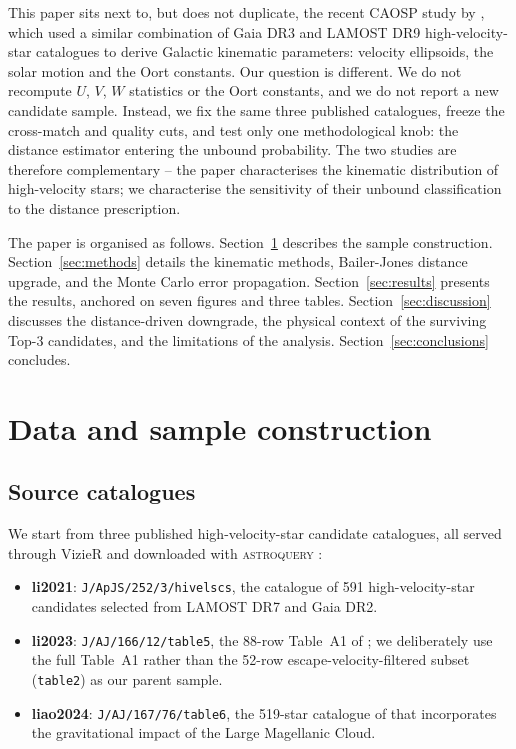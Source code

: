 \documentclass{caosp310}
\begin{document}
This paper sits next to, but does not duplicate, the recent CAOSP study
by \citet{Elsanhoury2025CAOSPKinematics}, which used a similar
combination of Gaia DR3 and LAMOST DR9 high-velocity-star catalogues to
derive Galactic kinematic parameters: velocity ellipsoids, the solar
motion and the Oort constants. Our question is different. We do not
recompute $U$, $V$, $W$ statistics or the Oort constants, and we do not
report a new candidate sample. Instead, we fix the same three published
catalogues, freeze the cross-match and quality cuts, and test only one
methodological knob: the distance estimator entering the unbound
probability. The two studies are therefore complementary -- the
\citeauthor{Elsanhoury2025CAOSPKinematics} paper characterises the
kinematic distribution of high-velocity stars; we characterise the
sensitivity of their unbound classification to the distance prescription.

The paper is organised as follows. Section~\ref{sec:data} describes the
sample construction. Section~\ref{sec:methods} details the kinematic
methods, Bailer-Jones distance upgrade, and the Monte Carlo error
propagation. Section~\ref{sec:results} presents the results, anchored on
seven figures and three tables. Section~\ref{sec:discussion} discusses the
distance-driven downgrade, the physical context of the surviving Top-3
candidates, and the limitations of the analysis. Section~\ref{sec:conclusions}
concludes.

\section{Data and sample construction}
\label{sec:data}

\subsection{Source catalogues}
\label{sec:catalogues}

We start from three published high-velocity-star candidate catalogues,
all served through VizieR \citep{Ochsenbein2000VizieR} and downloaded with
\textsc{astroquery} \citep{Ginsburg2019Astroquery}:

\begin{itemize}
  \item \textbf{li2021}: \texttt{J/ApJS/252/3/hivelscs}, the
        \citet{Li2021HVS591} catalogue of 591 high-velocity-star
        candidates selected from LAMOST DR7 and Gaia DR2.
  \item \textbf{li2023}: \texttt{J/AJ/166/12/table5}, the 88-row Table~A1
        of \citet{Li2023ExtremeVelocity88}; we deliberately use the full
        Table~A1 rather than the 52-row escape-velocity-filtered subset
        (\texttt{table2}) as our parent sample.
  \item \textbf{liao2024}: \texttt{J/AJ/167/76/table6}, the 519-star
        catalogue of \citet{Liao2024HVS519} that incorporates the
        gravitational impact of the Large Magellanic Cloud.
\end{itemize}
\end{document}
